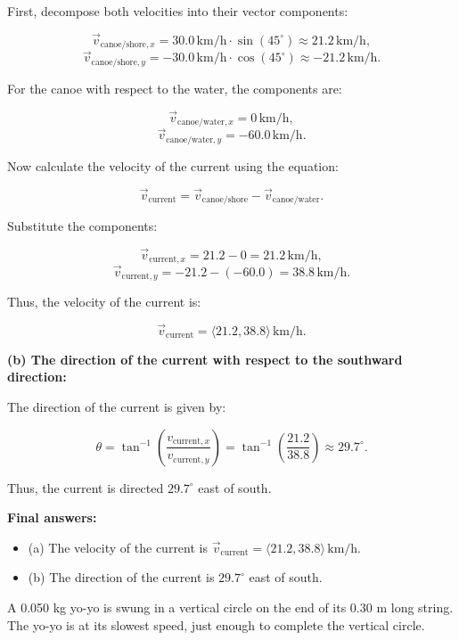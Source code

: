 \documentclass[addpoints]{exam}
\begin{document}
\begin{questions}
\begin{solution}[5cm]
First, decompose both velocities into their vector components:

\[
\vec{v}_{\text{canoe/shore}, x} = 30.0 \, \text{km/h} \cdot \sin(45^\circ) \approx 21.2 \, \text{km/h},
\]
\[
\vec{v}_{\text{canoe/shore}, y} = -30.0 \, \text{km/h} \cdot \cos(45^\circ) \approx -21.2 \, \text{km/h}.
\]

For the canoe with respect to the water, the components are:

\[
\vec{v}_{\text{canoe/water}, x} = 0 \, \text{km/h},
\]
\[
\vec{v}_{\text{canoe/water}, y} = -60.0 \, \text{km/h}.
\]

Now calculate the velocity of the current using the equation:

\[
\vec{v}_{\text{current}} = \vec{v}_{\text{canoe/shore}} - \vec{v}_{\text{canoe/water}}.
\]

Substitute the components:

\[
\vec{v}_{\text{current}, x} = 21.2 - 0 = 21.2 \, \text{km/h},
\]
\[
\vec{v}_{\text{current}, y} = -21.2 - (-60.0) = 38.8 \, \text{km/h}.
\]

Thus, the velocity of the current is:

\[
\vec{v}_{\text{current}} = \langle 21.2, 38.8 \rangle \, \text{km/h}.
\]

\textbf{(b) The direction of the current with respect to the southward direction:}

The direction of the current is given by:

\[
\theta = \tan^{-1}\left(\frac{v_{\text{current}, x}}{v_{\text{current}, y}}\right) = \tan^{-1}\left(\frac{21.2}{38.8}\right) \approx 29.7^\circ.
\]

Thus, the current is directed \( 29.7^\circ \) east of south.

\textbf{Final answers:}
\begin{itemize}
    \item (a) The velocity of the current is \( \vec{v}_{\text{current}} = \langle 21.2, 38.8 \rangle \, \text{km/h} \).
    \item (b) The direction of the current is \( 29.7^\circ \) east of south.
\end{itemize}

\end{solution}



\question A 0.050 kg yo-yo is swung in a vertical circle on the end of its 0.30 m long string. The yo-yo is at its slowest speed, just enough to complete the vertical circle.
\begin{parts}

\end{parts}
\end{questions}
\end{document}
